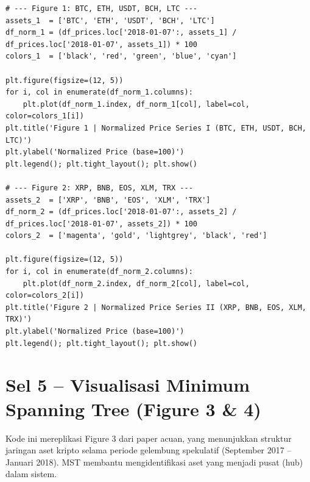 \documentclass[12pt,a4paper]{article}
\begin{document}
\begin{lstlisting}[caption={Dua set plot harga ternormalisasi}]
# --- Figure 1: BTC, ETH, USDT, BCH, LTC ---
assets_1  = ['BTC', 'ETH', 'USDT', 'BCH', 'LTC']
df_norm_1 = (df_prices.loc['2018-01-07':, assets_1] / df_prices.loc['2018-01-07', assets_1]) * 100
colors_1  = ['black', 'red', 'green', 'blue', 'cyan']

plt.figure(figsize=(12, 5))
for i, col in enumerate(df_norm_1.columns):
    plt.plot(df_norm_1.index, df_norm_1[col], label=col, color=colors_1[i])
plt.title('Figure 1 | Normalized Price Series I (BTC, ETH, USDT, BCH, LTC)')
plt.ylabel('Normalized Price (base=100)')
plt.legend(); plt.tight_layout(); plt.show()

# --- Figure 2: XRP, BNB, EOS, XLM, TRX ---
assets_2  = ['XRP', 'BNB', 'EOS', 'XLM', 'TRX']
df_norm_2 = (df_prices.loc['2018-01-07':, assets_2] / df_prices.loc['2018-01-07', assets_2]) * 100
colors_2  = ['magenta', 'gold', 'lightgrey', 'black', 'red']

plt.figure(figsize=(12, 5))
for i, col in enumerate(df_norm_2.columns):
    plt.plot(df_norm_2.index, df_norm_2[col], label=col, color=colors_2[i])
plt.title('Figure 2 | Normalized Price Series II (XRP, BNB, EOS, XLM, TRX)')
plt.ylabel('Normalized Price (base=100)')
plt.legend(); plt.tight_layout(); plt.show()
\end{lstlisting}

\section{Sel 5 -- Visualisasi Minimum Spanning Tree (Figure 3 \& 4)}
Kode ini mereplikasi Figure 3 dari paper acuan, yang menunjukkan struktur jaringan aset kripto selama periode gelembung spekulatif (September 2017 -- Januari 2018). MST membantu mengidentifikasi aset yang menjadi pusat (hub) dalam sistem.
\end{document}
